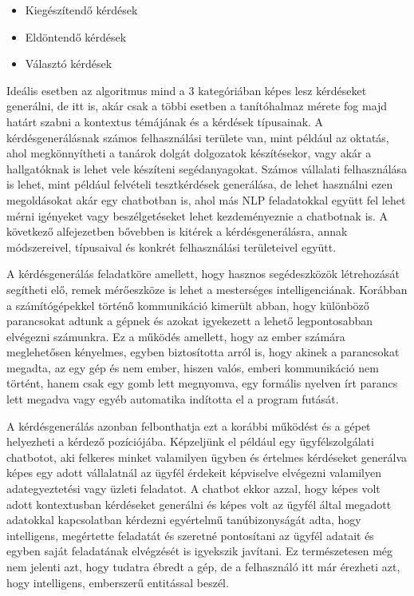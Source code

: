 \begin{itemize}
\item Kiegészítendő kérdések
\item Eldöntendő kérdések
\item Választó kérdések
\end{itemize}

Ideális esetben az algoritmus mind a 3 kategóriában képes lesz kérdéseket generálni, de itt is, akár csak a többi esetben a tanítóhalmaz mérete fog majd határt szabni a kontextus témájának és a kérdések típusainak. A kérdésgenerálásnak számos felhasználási területe van, mint például az oktatás, ahol megkönnyítheti a tanárok dolgát dolgozatok készítésekor, vagy akár a hallgatóknak is lehet vele készíteni segédanyagokat. Számos vállalati felhasználása is lehet, mint például felvételi tesztkérdések generálása, de lehet használni ezen megoldásokat akár egy chatbotban is, ahol más NLP feladatokkal együtt fel lehet mérni igényeket vagy beszélgetéseket lehet kezdeményeznie a chatbotnak is. A következő alfejezetben bővebben is kitérek a kérdésgenerálásra, annak módszereivel, típusaival és konkrét felhasználási területeivel együtt.
 

A kérdésgenerálás feladatköre amellett, hogy hasznos segédeszközök létrehozását segítheti elő, remek mérőeszköze is lehet a mesterséges intelligenciának. Korábban a számítógépekkel történő kommunikáció kimerült abban, hogy különböző parancsokat adtunk a gépnek és azokat igyekezett a lehető legpontosabban elvégezni számunkra. Ez a működés amellett, hogy az ember számára meglehetősen kényelmes, egyben biztosította arról is, hogy akinek a parancsokat megadta, az egy gép és nem ember, hiszen valós, emberi kommunikáció nem történt, hanem csak egy gomb lett megnyomva, egy formális nyelven írt parancs lett megadva vagy egyéb automatika indította el a program futását.

A kérdésgenerálás azonban felbonthatja ezt a korábbi működést és a gépet helyezheti a kérdező pozíciójába. Képzeljünk el például egy ügyfélszolgálati chatbotot, aki felkeres minket valamilyen ügyben és értelmes kérdéseket generálva képes egy adott vállalatnál az ügyfél érdekeit képviselve elvégezni valamilyen adategyeztetési vagy üzleti feladatot. A chatbot ekkor azzal, hogy képes volt adott kontextusban kérdéseket generálni és képes volt az ügyfél által megadott adatokkal kapcsolatban kérdezni egyértelmű tanúbizonyságát adta, hogy intelligens, megértette feladatát és szeretné pontosítani az ügyfél adatait és egyben saját feladatának elvégzését is igyekszik javítani. Ez természetesen még nem jelenti azt, hogy tudatra ébredt a gép, de a felhasználó itt már érezheti azt, hogy intelligens, emberszerű entitással beszél.

